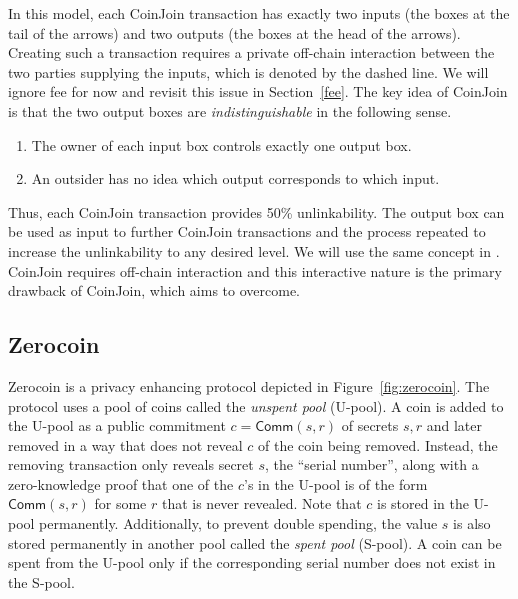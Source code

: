 \documentclass[runningheads]{llncs}
\newcommand{\zerocoin}{Zerocoin\xspace}
\begin{document}
In this model, each CoinJoin transaction has exactly two inputs (the boxes at the tail of the arrows) and two outputs (the boxes at the head of the arrows). Creating such a transaction requires a private off-chain interaction between the two parties supplying the inputs, which is denoted by the dashed line. We will ignore fee for now and revisit this issue in Section~\ref{fee}.
The key idea of CoinJoin is that the two output boxes are {\em indistinguishable} in the following sense. 
\begin{enumerate}
    \item The owner of each input box controls exactly one output box.
    \item An outsider has no idea which output corresponds to which input.
\end{enumerate}

Thus, each CoinJoin transaction provides 50\% unlinkability. The output box can be used as input to further CoinJoin transactions and the process repeated to increase the unlinkability to any desired level. We will use the same concept in \algname. 
CoinJoin requires off-chain interaction and this interactive nature is the primary drawback of CoinJoin, which \algname aims to overcome. 

\subsection{\zerocoin}
\label{zerocoin} 

\zerocoin is a privacy enhancing protocol 
depicted in Figure~\ref{fig:zerocoin}. The protocol 
uses a pool of coins called the {\em unspent pool} (U-pool). A coin is added to the U-pool as a public commitment $c = \mathsf{Comm}(s, r)$ of secrets $s, r$ and later removed in a way
that does not reveal $c$ of the coin being removed. Instead, the removing transaction only reveals secret $s$, the ``serial number'', along with a zero-knowledge proof that one of the $c$'s in the U-pool is of the form $\mathsf{Comm}(s, r)$ for some $r$ that is never revealed. Note that $c$ is stored in the U-pool permanently.
Additionally, to prevent double spending, the value $s$ is also stored permanently in another pool called the {\em spent pool} (S-pool). A coin can be spent from the U-pool only if the corresponding serial number does not exist in the S-pool. 
\end{document}
